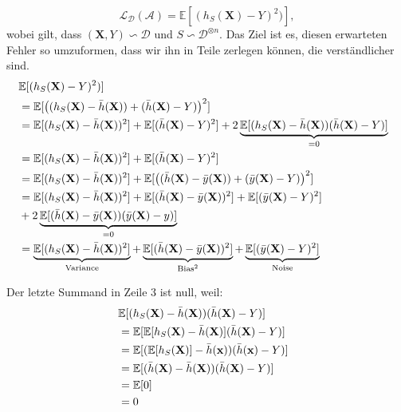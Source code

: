 $$ \mathcal{L}_{\mathcal{D}}(\mathcal{A}) = \mathbb{E}[(h_S(\mathbf{\mathbf{X}})-Y)^2)],$$
wobei gilt, dass $(\mathbf{X}, Y) \backsim \mathcal{D}$ und $S \backsim \mathcal{D}^{\otimes n}$.
Das Ziel ist es, diesen erwarteten Fehler so umzuformen, dass wir ihn in Teile zerlegen k\"onnen, die verst\"andlicher sind. 
\begin{equation*}
  \begin{split}
    \lefteqn{ \mathbb{E}[(h_S(\mathbf{X})-Y)^2)] } \\\
    & = \mathbb{E}[\bigl((h_S(\mathbf{X})-\bar{h}(\mathbf{X}))+(\bar{h}(\mathbf{X})-Y)\bigr)^2] \\\
    & = \mathbb{E}[(h_S(\mathbf{X})- \bar{h}(\mathbf{X}))^2] + \mathbb{E}[(\bar{h}(\mathbf{X})-Y)^2] + 2\underbrace{\mathbb{E}[(h_S(\mathbf{X})-\bar{h}(\mathbf{X}))(\bar{h}(\mathbf{X})-Y)]}_{=0} \\\
    & = \mathbb{E}[(h_S(\mathbf{X})- \bar{h}(\mathbf{X}))^2] + \mathbb{E}[(\bar{h}(\mathbf{X})-Y)^2] \\\
    & = \mathbb{E}[(h_S(\mathbf{X})- \bar{h}(\mathbf{X}))^2] + \mathbb{E}[\bigl( (\bar{h}(\mathbf{X})-\bar{y}(\mathbf{X}))+(\bar{y}(\mathbf{X})-Y)\bigr)^2 ] \\\
    & = \mathbb{E}[(h_S(\mathbf{X})- \bar{h}(\mathbf{X}))^2] + \mathbb{E}[(\bar{h}(\mathbf{X})-\bar{y}(\mathbf{X}))^2] +\mathbb{E}[(\bar{y}(\mathbf{X})-Y)^2] \\\
    &+ 2\underbrace{\mathbb{E}[(\bar{h}(\mathbf{X})-\bar{y}(\mathbf{X}))(\bar{y}(\mathbf{X})-y)]}_{=0} \\\
    & = \underbrace{\mathbb{E}[(h_S(\mathbf{X})- \bar{h}(\mathbf{X}))^2]}_{\text{Variance}}+\underbrace{\mathbb{E}[(\bar{h}(\mathbf{X})-\bar{y}(\mathbf{X}))^2]}_{\text{Bias}^2} + \underbrace{\mathbb{E}[(\bar{y}(\mathbf{X})-Y)^2]}_{\text{Noise}}
  \end{split}
\end{equation*}

Der letzte Summand in Zeile 3 ist null, weil:
\begin{equation*}
  \begin{split}
    \lefteqn{ \mathbb{E}[(h_S(\mathbf{X})-\bar{h}(\mathbf{X}))(\bar{h}(\mathbf{X})-Y)] } \\\
    & = \mathbb{E}[\mathbb{E}[h_S(\mathbf{X})-\bar{h}(\mathbf{X})](\bar{h}(\mathbf{X})-Y)] \\\
    & = \mathbb{E}[(\mathbb{E}[h_S(\mathbf{X})]-\bar{h}(\mathbf{x}))(\bar{h}(\mathbf{x})-Y)] \\\
    & = \mathbb{E}[(\bar{h}(\mathbf{X})-\bar{h}(\mathbf{X}))(\bar{h}(\mathbf{X})-Y)] \\\
    & = \mathbb{E}[0]\\\
    & = 0
  \end{split}
\end{equation*}


